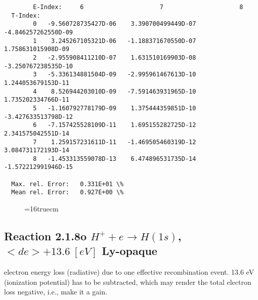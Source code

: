 \documentclass[12pt,dvipdfmx]{article}
\begin{document}
\begin{small}
\begin{verbatim}
        E-Index:     6                     7                     8
  T-Index:
        0   -9.560728735427D-06    3.390700499449D-07   -4.846257262550D-09
        1    3.245267105321D-06   -1.188371670550D-07    1.758631015908D-09
        2   -2.955908411210D-07    1.631510169903D-08   -3.250767238535D-10
        3   -5.336134881504D-09   -2.995961467613D-10    1.244053679153D-11
        4    8.526944203010D-09   -7.591463931965D-10    1.735202334766D-11
        5   -1.160792778179D-09    1.375444359851D-10   -3.427633513798D-12
        6   -7.157425528109D-11    1.695155282725D-12    2.341575042551D-14
        7    1.259157231611D-11   -1.469505460319D-12    3.084731172193D-14
        8   -1.453313559078D-13    6.474896531735D-14   -1.572212991946D-15

  Max. rel. Error:   0.331E+01 \%
  Mean rel. Error:   0.927E+00 \%

\end{verbatim}\end{small}
\begin{figure} \label{2.1.8lr2}
\epsfxsize=16truecm
\end{figure}
\newpage




\subsection{
  Reaction 2.1.8o $H^+ + e \rightarrow H(1s) $, \ $ <de> + 13.6 \ [eV] $
  Ly-opaque
}

  electron energy loss (radiative) due to one effective recombination event.
  13.6 eV (ionization potential) has to be
  subtracted, which may render the total electron loss negative, i.e., make it a gain.
\end{document}
